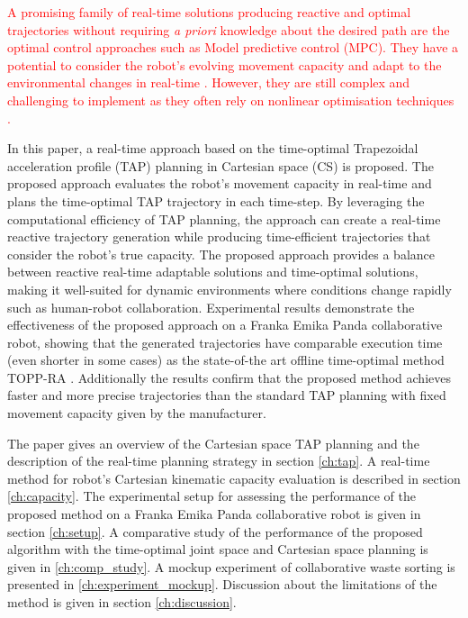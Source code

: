 \textcolor{red}{
A promising family of real-time solutions producing reactive and optimal trajectories without requiring \textit{a priori} knowledge about the desired path are the optimal control approaches such as Model predictive control (MPC). They have a potential to consider the robot's evolving movement capacity and adapt to the environmental changes in real-time \cite{torresalberto2022}\cite{Eckhoff2022}. However, they are still complex and challenging to implement as they often rely on nonlinear optimisation techniques \cite{kelff2021,Massaro2023}.}


In this paper, a real-time approach based on the time-optimal Trapezoidal acceleration profile (TAP) \cite{modernrobotics} planning in Cartesian space (CS) is proposed. The proposed approach evaluates the robot's movement capacity in real-time and plans the time-optimal TAP trajectory in each time-step. By leveraging the computational efficiency of TAP planning, the approach can create a real-time reactive trajectory generation while producing time-efficient trajectories that consider the robot's true capacity. The proposed approach provides a balance between reactive real-time adaptable solutions and time-optimal solutions, making it well-suited for dynamic environments where conditions change rapidly such as human-robot collaboration. 
Experimental results demonstrate the effectiveness of the proposed approach on a Franka Emika Panda collaborative robot, showing that the generated trajectories have comparable execution time (even shorter in some cases) as the state-of-the art offline time-optimal method TOPP-RA \cite{Pham2018}. Additionally the results confirm that the proposed method achieves faster and more precise trajectories than the standard TAP planning with fixed movement capacity given by the manufacturer. 


The paper gives an overview of the Cartesian space TAP planning and the description of the real-time planning strategy in section \ref{ch:tap}. A real-time method for robot's Cartesian kinematic capacity evaluation is described in section \ref{ch:capacity}. The experimental setup for assessing the performance of the proposed method on a Franka Emika Panda collaborative robot is given in section \ref{ch:setup}. A comparative study of the performance of the proposed algorithm with the time-optimal joint space and Cartesian space planning is given in \ref{ch:comp_study}. A mockup experiment of collaborative waste sorting is presented in \ref{ch:experiment_mockup}. Discussion about the limitations of the method is given in section \ref{ch:discussion}.



